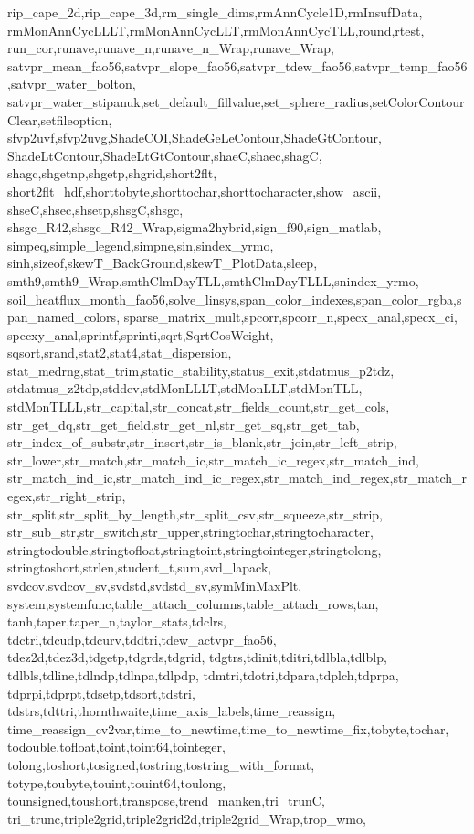 {{	rip_cape_2d,rip_cape_3d,rm_single_dims,rmAnnCycle1D,rmInsufData,
	rmMonAnnCycLLLT,rmMonAnnCycLLT,rmMonAnnCycTLL,round,rtest,
	run_cor,runave,runave_n,runave_n_Wrap,runave_Wrap,
	satvpr_mean_fao56,satvpr_slope_fao56,satvpr_tdew_fao56,satvpr_temp_fao56,satvpr_water_bolton,
	satvpr_water_stipanuk,set_default_fillvalue,set_sphere_radius,setColorContourClear,setfileoption,
	sfvp2uvf,sfvp2uvg,ShadeCOI,ShadeGeLeContour,ShadeGtContour,
	ShadeLtContour,ShadeLtGtContour,shaeC,shaec,shagC,
	shagc,shgetnp,shgetp,shgrid,short2flt,
	short2flt_hdf,shorttobyte,shorttochar,shorttocharacter,show_ascii,
	shseC,shsec,shsetp,shsgC,shsgc,
	shsgc_R42,shsgc_R42_Wrap,sigma2hybrid,sign_f90,sign_matlab,
	simpeq,simple_legend,simpne,sin,sindex_yrmo,
	sinh,sizeof,skewT_BackGround,skewT_PlotData,sleep,
	smth9,smth9_Wrap,smthClmDayTLL,smthClmDayTLLL,snindex_yrmo,
	soil_heatflux_month_fao56,solve_linsys,span_color_indexes,span_color_rgba,span_named_colors,
	sparse_matrix_mult,spcorr,spcorr_n,specx_anal,specx_ci,
	specxy_anal,sprintf,sprinti,sqrt,SqrtCosWeight,
	sqsort,srand,stat2,stat4,stat_dispersion,
	stat_medrng,stat_trim,static_stability,status_exit,stdatmus_p2tdz,
	stdatmus_z2tdp,stddev,stdMonLLLT,stdMonLLT,stdMonTLL,
	stdMonTLLL,str_capital,str_concat,str_fields_count,str_get_cols,
	str_get_dq,str_get_field,str_get_nl,str_get_sq,str_get_tab,
	str_index_of_substr,str_insert,str_is_blank,str_join,str_left_strip,
	str_lower,str_match,str_match_ic,str_match_ic_regex,str_match_ind,
	str_match_ind_ic,str_match_ind_ic_regex,str_match_ind_regex,str_match_regex,str_right_strip,
	str_split,str_split_by_length,str_split_csv,str_squeeze,str_strip,
	str_sub_str,str_switch,str_upper,stringtochar,stringtocharacter,
	stringtodouble,stringtofloat,stringtoint,stringtointeger,stringtolong,
	stringtoshort,strlen,student_t,sum,svd_lapack,
	svdcov,svdcov_sv,svdstd,svdstd_sv,symMinMaxPlt,
	system,systemfunc,table_attach_columns,table_attach_rows,tan,
	tanh,taper,taper_n,taylor_stats,tdclrs,
	tdctri,tdcudp,tdcurv,tddtri,tdew_actvpr_fao56,
	tdez2d,tdez3d,tdgetp,tdgrds,tdgrid,
	tdgtrs,tdinit,tditri,tdlbla,tdlblp,
	tdlbls,tdline,tdlndp,tdlnpa,tdlpdp,
	tdmtri,tdotri,tdpara,tdplch,tdprpa,
	tdprpi,tdprpt,tdsetp,tdsort,tdstri,
	tdstrs,tdttri,thornthwaite,time_axis_labels,time_reassign,
	time_reassign_cv2var,time_to_newtime,time_to_newtime_fix,tobyte,tochar,
	todouble,tofloat,toint,toint64,tointeger,
	tolong,toshort,tosigned,tostring,tostring_with_format,
	totype,toubyte,touint,touint64,toulong,
	tounsigned,toushort,transpose,trend_manken,tri_trunC,
	tri_trunc,triple2grid,triple2grid2d,triple2grid_Wrap,trop_wmo,
}}
